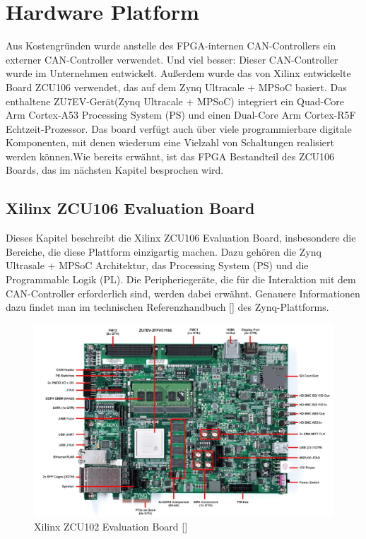 \section{Hardware Platform}
\label{cha:ver:sec:Hardware_Platform}

Aus Kostengründen wurde anstelle des FPGA-internen CAN-Controllers ein externer CAN-Controller verwendet. Und viel besser: Dieser CAN-Controller wurde im Unternehmen entwickelt.  Außerdem wurde das von Xilinx entwickelte Board ZCU106 verwendet, das auf dem Zynq Ultracale + MPSoC basiert. Das enthaltene ZU7EV-Gerät(Zynq Ultracale + MPSoC) integriert ein Quad-Core Arm Cortex-A53 Processing System (PS) und einen Dual-Core Arm Cortex-R5F Echtzeit-Prozessor. Das board verfügt auch über viele programmierbare digitale Komponenten, mit denen wiederum eine Vielzahl von Schaltungen realisiert werden können.Wie bereits erwähnt, ist das FPGA Bestandteil des ZCU106 Boards, das im nächsten Kapitel besprochen wird.

\subsection{Xilinx ZCU106 Evaluation Board}

Dieses Kapitel beschreibt die Xilinx ZCU106 Evaluation Board, insbesondere die Bereiche, die diese Plattform einzigartig machen. Dazu gehören die Zynq Ultrasale + MPSoC Architektur, das Processing System (PS) und die Programmable Logik (PL). Die Peripheriegeräte, die für die Interaktion mit dem CAN-Controller erforderlich sind, werden dabei erwähnt. Genauere Informationen dazu findet man im technischen Referenzhandbuch [\cite{XilinxInc.2019}] des Zynq-Plattforms. 

\begin{figure}[H]
	\begin{center}
		\includegraphics[width=1\textwidth]{./images/zcu106.jpg}
	\end{center}
	\vspace{-5pt}
	\caption[Xilinx ZCU102 Evaluation Board]{Xilinx ZCU102 Evaluation Board [\cite{zcuboard.}]}  %
	\label{fig:zcu:board}
	\vspace{-5pt}
\end{figure}

